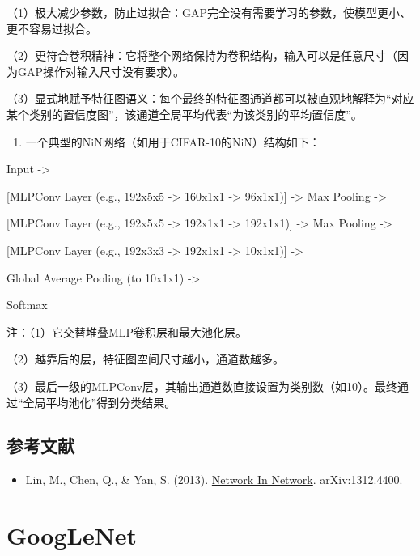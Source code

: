 （1）极大减少参数，防止过拟合：GAP完全没有需要学习的参数，使模型更小、更不容易过拟合。

（2）更符合卷积精神：它将整个网络保持为卷积结构，输入可以是任意尺寸（因为GAP操作对输入尺寸没有要求）。

（3）显式地赋予特征图语义：每个最终的特征图通道都可以被直观地解释为``对应某个类别的置信度图''，该通道全局平均代表``为该类别的平均置信度''。

\begin{enumerate}
\def\labelenumi{\arabic{enumi}.}
\setcounter{enumi}{2}
\tightlist
\item
  一个典型的NiN网络（如用于CIFAR-10的NiN）结构如下：
\end{enumerate}

Input -\textgreater{}

{[}MLPConv Layer (e.g., 192x5x5 -\textgreater{} 160x1x1 -\textgreater{} 96x1x1){]} -\textgreater{} Max Pooling -\textgreater{}

{[}MLPConv Layer (e.g., 192x5x5 -\textgreater{} 192x1x1 -\textgreater{} 192x1x1){]} -\textgreater{} Max Pooling -\textgreater{}

{[}MLPConv Layer (e.g., 192x3x3 -\textgreater{} 192x1x1 -\textgreater{} 10x1x1){]} -\textgreater{}

Global Average Pooling (to 10x1x1) -\textgreater{}

Softmax

注：（1）它交替堆叠MLP卷积层和最大池化层。

（2）越靠后的层，特征图空间尺寸越小，通道数越多。

（3）最后一级的MLPConv层，其输出通道数直接设置为类别数（如10）。最终通过``全局平均池化''得到分类结果。

\hypertarget{ux53c2ux8003ux6587ux732e-12}{%
\subsection{参考文献}\label{ux53c2ux8003ux6587ux732e-12}}

\vspace{0.25em}
\begin{itemize}
\tightlist
\item
  Lin, M., Chen, Q., \& Yan, S. (2013). \href{https://arxiv.org/abs/1312.4400}{Network In Network}. arXiv:1312.4400.
\end{itemize}

\clearpage

\hypertarget{googlenet}{%
\section{GoogLeNet}\label{googlenet}}

